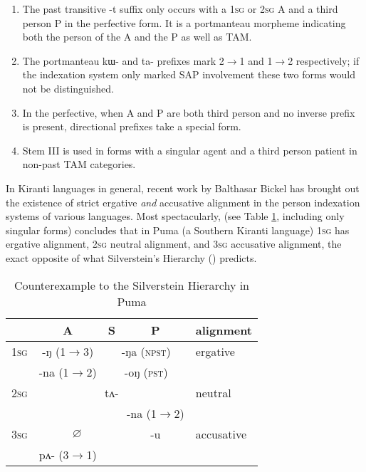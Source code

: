 \documentclass[oldfontcommands,oneside,a4paper,11pt]{article}
\newcommand{\ipa}[1]{{\phon \mbox{#1}}} %
\newcommand{\grise}[1]{\cellcolor{lightgray}\textbf{#1}}
\begin{document}
\begin{enumerate}
\item The past transitive \ipa{-t} suffix only occurs with a \textsc{1sg} or \textsc{2sg} A and a third person P in the perfective form. It is a portmanteau morpheme indicating both the person of the A and the P as well as TAM.
\item The portmanteau \ipa{kɯ-} and \ipa{ta-} prefixes mark 2$\rightarrow$1 and 1$\rightarrow$2 respectively; if the indexation system only marked SAP involvement these two forms would not be distinguished.
\item In the perfective, when A and P are both third person and no inverse prefix is present, directional prefixes take a special form.
\item Stem III is used in forms with a singular agent and a third person patient in non-past TAM categories.
\end{enumerate}

In Kiranti languages in general, recent work by Balthasar Bickel has brought out the existence of strict ergative \textit{and} accusative alignment in the person indexation systems of various languages. Most spectacularly, \citet{bickel08scope} (see Table \ref{tab:silverstein}, including only singular forms) concludes that in Puma (a Southern Kiranti language) \textsc{1sg} has ergative alignment, \textsc{2sg} neutral alignment, and \textsc{3sg} accusative alignment, the exact opposite of what  Silverstein's Hierarchy (\citealt{silverstein76}) predicts.

\begin{table}[H]
\caption{Counterexample to the Silverstein Hierarchy in Puma} \label{tab:silverstein} \centering
\begin{tabular}{l|c|c|c|l}
\toprule
& A & S & P & alignment\\
\hline
\textsc{1sg}& \ipa{-ŋ} (1$\rightarrow$3)& \multicolumn{2}{|c|}{\ipa{-ŋa} \grise{}(\textsc{npst})}  &ergative\\
 & \ipa{-na} (1$\rightarrow$2)& \multicolumn{2}{|c|}{\ipa{-oŋ} \grise{}(\textsc{pst})} &\\
\hline
 \textsc{2sg} & \multicolumn{3}{c|}{\ipa{tʌ-}}& neutral\\
 \cline{4-4}
 &\multicolumn{2}{c|}{}&\ipa{-na} (1$\rightarrow$2)&\\
 \hline
  \textsc{3sg} & \multicolumn{2}{c|}{$\varnothing$} & \ipa{-u} &accusative\\
   \cline{2-2}
  &\ipa{pʌ-}  (3$\rightarrow$1) & &\\
  \bottomrule
\end{tabular}
\end{table}
\end{document}
